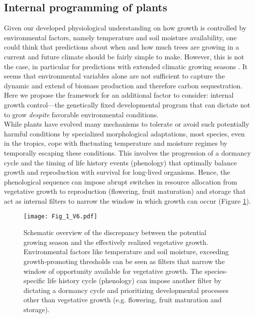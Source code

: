 \documentclass{article}
\begin{document}
		\subsection*{Internal programming of plants}
		Given our developed physiological understanding on how growth is controlled by environmental factors, namely temperature and soil moisture availability, one could think that predictions about when and how much trees are growing in a current and future climate should be fairly simple to make. However, this is not the case, in particular for predictions with extended climatic growing seasons \citep{zohnerHowChangesSpring2021}. It seems that environmental variables alone are not sufficient to capture the dynamic and extend of biomass production and therefore carbon sequestration.  Here we propose the framework for an additional factor to consider: internal growth control---the genetically fixed developmental program that can dictate not to grow \textit{despite} favorable environmental conditions.\\
		
		While plants have evolved many mechanisms to tolerate or avoid such potentially harmful conditions by specialized morphological adaptations, most species, even in the tropics, cope with fluctuating temperature and moisture regimes by temporally escaping these conditions. This involves the progression of a dormancy cycle and the timing of life history events (phenology) that optimally balance growth and reproduction with survival for long-lived organisms. Hence, the phenological sequence can impose abrupt switches in resource allocation from vegetative growth to reproduction (flowering, fruit maturation) and storage \citep{stearnsTradeOffsLifeHistoryEvolution1989, chapinEcologyEconomicsStorage1990} that act as internal filters to narrow the window in which growth can occur (Figure \ref{fig:fig_1xxx}).\\
			
		
								\begin{figure}
								\centering
								\texttt{[image: Fig\_1\_V6.pdf]} 
								\caption{Schematic overview of the discrepancy between the potential growing season and the effectively realized vegetative growth. Environmental factors like temperature and soil moisture, exceeding growth-promoting thresholds can be seen as filters that narrow the window of opportunity available for vegetative growth. The species-specific life history cycle (phenology) can impose another filter by dictating a dormancy cycle and prioritizing developmental processes other than vegetative growth (e.g. flowering, fruit maturation and storage). }
								\label{fig:fig_1xxx}
							\end{figure}
\end{document}
